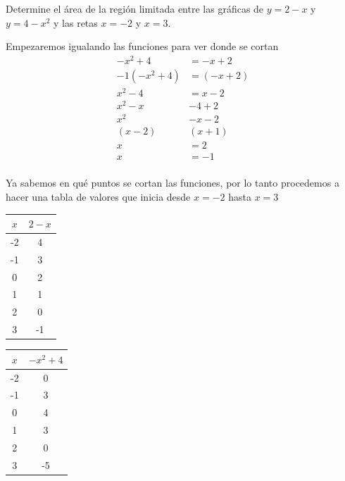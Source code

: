 \documentclass[12pt]{article}
\begin{document}
\begin{flushleft}
Determine el área de la región limitada entre las gráficas de $y=2-x$ y $y=4-x^{2}$ y las retas $x=-2$ y $x=3$.
\vspace{0.5cm}

Empezaremos igualando las funciones para ver donde se cortan \\

\begin{align*}
    -x^{2}+4&=-x+2\\
    -1\left(-x^{2}+4\right)&=\left(-x+2\right)\\
    x^{2}-4&=x-2\\
    x^{2}-x&-4+2\\
    x^{2}&-x-2\\
    \left(x-2\right)&\left(x+1\right)\\
    x&=2\\
    x&=-1\\
\end{align*}

Ya sabemos en qué puntos se cortan las funciones, por lo tanto procedemos a hacer una tabla de valores que inicia desde $x=-2$ hasta $x=3$

\begin{multicols}{2}

\begin{tabular}{|c|c|}
    \hline
    $x$ & $2-x$  \\
    \hline
    -2 & 4\\
    \hline
    -1 & 3\\
    \hline
    0 & 2\\
    \hline
    1 & 1\\
    \hline
    2 & 0 \\
    \hline
    3 & -1\\
    \hline
\end{tabular}


\columnbreak


\begin{tabular}{|c|c|}
    \hline
    $x$ & $-x^{2}+4$\\
    \hline
    -2 & 0\\
    \hline
    -1 & 3\\
    \hline
    0 & 4\\
    \hline
    1 & 3\\
    \hline
    2 & 0\\
    \hline
    3 & -5\\
    \hline
\end{tabular}
\end{multicols}



\end{flushleft}
\end{document}
